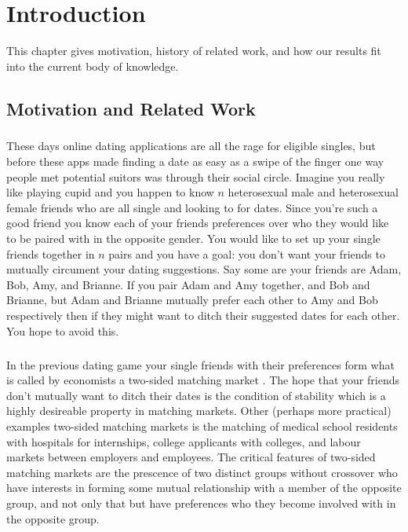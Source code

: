 \chapter{Introduction}
This chapter gives motivation, history of related work, and how our results fit into the current body of knowledge.

\section{Motivation and Related Work}

\paragraph{}
These days online dating applications are all the rage for eligible singles, but before these apps made finding a date as easy as a swipe of the finger one way people met potential suitors was through their social circle. Imagine you really like playing cupid and you happen to know $n$ heterosexual male and heterosexual female friends who are all single and looking to for dates. Since you're such a good friend you know each of your friends preferences over who they would like to be paired with in the opposite gender. You would like to set up your single friends together in $n$ pairs and you have a goal: you don't want your friends to mutually circument your dating suggestions. Say some are your friends are Adam, Bob, Amy, and Brianne. If you pair Adam and Amy together, and Bob and Brianne, but Adam and Brianne mutually prefer each other to Amy and Bob respectively then if they might want to ditch their suggested dates for each other. You hope to avoid this.
\paragraph{}
In the previous dating game your single friends with their preferences form what is called by economists a two-sided matching market \cite{roth1992two}. The hope that your friends don't mutually want to ditch their dates is the condition of stability which is a highly desireable property in matching markets. Other (perhaps more practical) examples two-sided matching markets is the matching of medical school residents with hospitals for internships, college applicants with colleges, and labour markets between employers and employees. The critical features of two-sided matching markets are the prescence of two distinct groups without crossover who have interests in forming some mutual relationship with a member of the opposite group, and not only that but have preferences who they become involved with in the opposite group.
